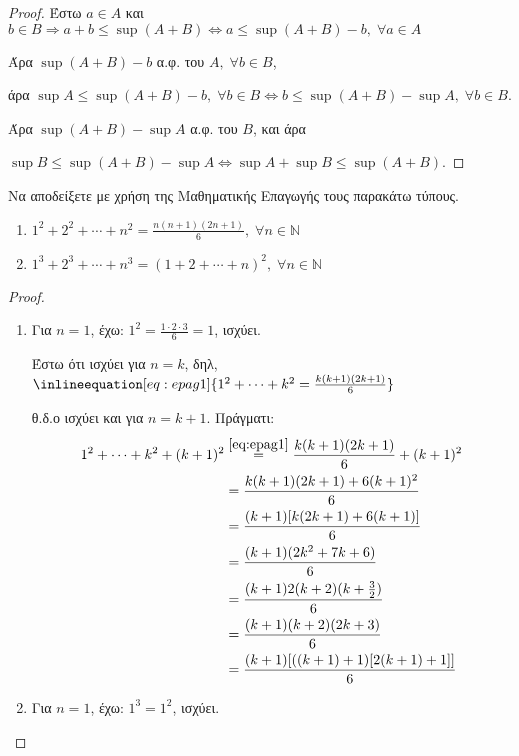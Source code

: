 \begin{multicols}{2}
\begin{enumerate}
\begin{proof}
        Έστω $ a \in A $ και $ b \in B \Rightarrow a+b \leq \sup (A+B) 
        \Leftrightarrow a \leq \sup (A+B) - b, \; \forall a \in A $ 

        Άρα $ \sup (A+B) - b $ α.φ. του $A, \; \forall b \in B $, 

        άρα $ \sup A \leq \sup (A+B) - b, \; \forall b \in B \Leftrightarrow 
        b \leq \sup (A+B) - \sup A , \; \forall b \in B$. 

        Άρα $ \sup (A+B) - \sup A $ α.φ. του $B$, και άρα 

        $ \sup B \leq \sup (A+B) - \sup A \Leftrightarrow \sup A + \sup B \leq 
        \sup (A+B)$.
      \end{proof}

    \item \textcolor{Col1}{Να αποδείξετε με χρήση της Μαθηματικής Επαγωγής 
        τους παρακάτω τύπους.  
        \begin{enumerate}
          \item $ 1^{2} + 2^{2} + \cdots + n^{2} = \frac{n(n+1)(2n+1)}{6}, \; 
            \forall n \in \mathbb{N} $
          \item $ 1^{3} + 2^{3} + \cdots + n^{3} = (1+2+\cdots + n)^{2}, \; 
            \forall n \in \mathbb{N} $
      \end{enumerate}}
      \begin{proof}
      \item {}
        \begin{enumerate}
          \item Για $ n=1 $, έχω: $ 1^{2} = \frac{1\cdot 2 \cdot 3}{6} = 1 $, 
            ισχύει.

            Έστω ότι ισχύει για $n=k$, δηλ, 
            $ \inlineequation[eq:epag1]{1^{2} + \cdots + k^{2} = 
            \frac{k (k+1)(2k+1)}{6}} $

            θ.δ.ο ισχύει και για $ n=k+1 $. Πράγματι:
            \begin{align*}
              1^{2} + \cdots + k^{2} + (k+1)^{2} 
                        &\overset{\eqref{eq:epag1}}{=}\frac{k(k+1)(2k+1)}{6} 
                        + (k+1)^{2} \\
                        &= \frac{k(k+1)(2k+1)+6(k+1)^{2}}{6} \\
                        &= \frac{(k+1)[k(2k+1)+6(k+1)]}{6} \\
                        &= \frac{(k+1)(2k^{2}+7k+6)}{6} \\
                        &= \frac{(k+1)2(k+2)(k+ \frac{3}{2})}{6} \\
                        &= \frac{(k+1)(k+2)(2k+3)}{6} \\
                        &= \frac{(k+1)[((k+1)+1)[2(k+1)+1]]}{6} 
            \end{align*}
          \item Για $ n=1 $, έχω: $ 1^{3} = 1^{2} $, ισχύει.


\end{enumerate}
\end{proof}
\end{enumerate}
\end{multicols}
